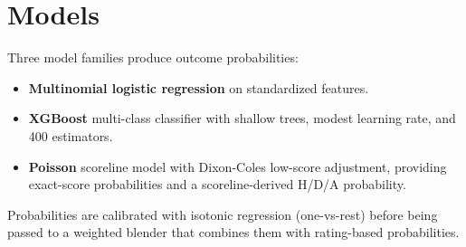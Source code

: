 \section{Models}
Three model families produce outcome probabilities:
\begin{itemize}
  \item \textbf{Multinomial logistic regression} on standardized features.
  \item \textbf{XGBoost} multi-class classifier with shallow trees, modest
        learning rate, and 400 estimators.
  \item \textbf{Poisson} scoreline model with Dixon-Coles low-score
        adjustment, providing exact-score probabilities and a scoreline-derived
        H/D/A probability.
\end{itemize}
Probabilities are calibrated with isotonic regression (one-vs-rest) before
being passed to a weighted blender that combines them with rating-based
probabilities.
